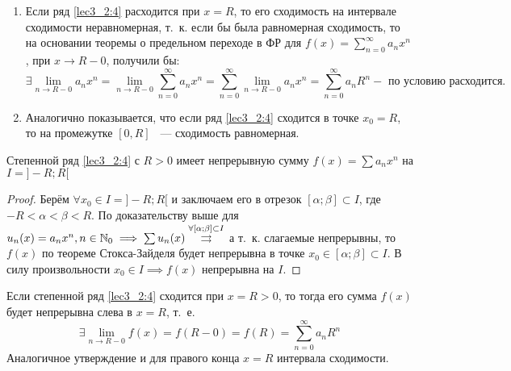 \documentclass[../../main.tex]{subfiles}
\begin{document}
\begin{rems}
	\;
	
	\begin{enumerate}
		\item Если ряд \eqref{lec3_2:4} расходится при $x = R$, то его 
		сходимость на интервале сходимости неравномерная, т.~к. если 
		бы была равномерная сходимость, то на основании теоремы 
		о предельном переходе в ФР для $f(x) = \sum\limits_{n = 0}^{\infty} 
		a_n x^n$, при $x \longrightarrow R - 0$, получили бы:
		\[ \exists \underset{n \to R - 0}{\lim} a_n x^n = 
		\underset{n \to R - 0}{\lim} \sum\limits_{n = 0}^{\infty} a_n x^n = 	
		\sum\limits_{n = 0}^{\infty} \underset{n \to R - 0}{\lim} a_n x^n = 
		\sum\limits_{n = 0}^{\infty} a_n R^n - \text{ по условию расходится.}
		\]
		
		\item Аналогично показывается, что если ряд 
		\eqref{lec3_2:4} сходится в точке 
		$x_0 = R$, то на промежутке $[0, R]$ ~--- сходимость равномерная.
	\end{enumerate}
\end{rems}

\begin{crl*}
	\;
	
	Степенной ряд \eqref{lec3_2:4} с $R > 0$ имеет непрерывную сумму 
	$f(x) = \sum a_n x^n$ на $I = ]-R; R[$
\end{crl*}

\begin{proof}
	Берём $\forall x_0 \in I = ]-R; R[$ и заключаем его в отрезок 
	$[\alpha; \beta] \subset I$, где $-R < \alpha < \beta < R$. 
	По доказательству выше для $u_n(x) = a_n x^n, n \in \mathbb{N}_0 \implies 
	\sum u_n(x) \overset{\forall [\alpha; \beta] \subset I}{\rightrightarrows}$
	а т.~к. слагаемые непрерывны, то $f(x)$ по теореме Стокса-Зайделя
	будет непрерывна в точке $x_0 \in [\alpha; \beta] \subset I$.
	В силу произвольности $x_0 \in I \implies f(x)$ непрерывна на $I$.
\end{proof}

\begin{crl*}
	Если степенной ряд \eqref{lec3_2:4} сходится при $x = R > 0$, то
	тогда его сумма $f(x)$ будет непрерывна слева в $x = R$, т.~е.
	\[ \exists \underset{n \to R - 0}{\lim} f(x) = f(R - 0) = f(R) 
	= \sum\limits_{n = 0}^{\infty} a_n R^n
	\]
	Аналогичное утверждение и для правого конца $x = R$ интервала сходимости.
\end{crl*}
\end{document}
